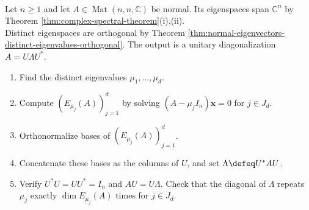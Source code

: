 \begin{computationmethod} \label{meth:finding-spectral-decomposition-normal-matrix} \\
Let $n\geq1$ and let $A\in\operatorname{Mat}(n,n,\mathbb{C})$ be normal. Its eigenspaces span $\mathbb{C}^n$ by Theorem \ref{thm:complex-spectral-theorem}(i),(ii).\\
Distinct eigenspaces are orthogonal by Theorem \ref{thm:normal-eigenvectors-distinct-eigenvalues-orthogonal}. The output is a unitary diagonalization $A=U\Lambda U^*$.
\begin{enumerate}[label=\roman*.]
\setlength{\itemsep}{0pt}
\item Find the distinct eigenvalues $\mu_1,\ldots,\mu_d$.
\item Compute $(E_{\mu_j}(A))_{j=1}^{d}$ by solving $(A-\mu_jI_n)\mathbf{x}=0$ for $j\in J_d$.
\item Orthonormalize bases of $(E_{\mu_j}(A))_{j=1}^{d}$.
\item Concatenate these bases as the columns of $U$, and set $\Lambda\defeq U^*AU$.
\item Verify $U^*U=UU^*=I_n$ and $AU=U\Lambda$. Check that the diagonal of $\Lambda$ repeats $\mu_j$ exactly $\dim E_{\mu_j}(A)$ times for $j\in J_d$.
\end{enumerate}
\end{computationmethod}

